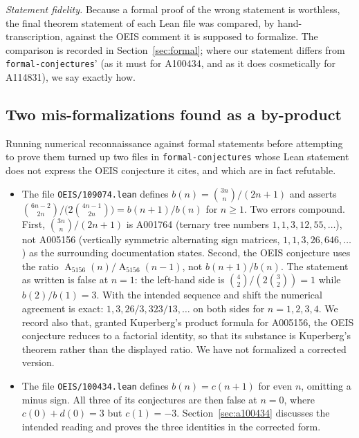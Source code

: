 \documentclass[11pt]{article}
\theoremstyle{plain}
\theoremstyle{definition}
\theoremstyle{remark}
\numberwithin{equation}{section}
\DeclareMathOperator{\Ac}{A}
\begin{document}
\emph{Statement fidelity.} Because a formal proof of the wrong statement is worthless, the final
theorem statement of each Lean file was compared, by hand-transcription, against the OEIS
comment it is supposed to formalize. The comparison is recorded in Section~\ref{sec:formal};
where our statement differs from \texttt{formal-conjectures}' (as it must for A100434, and as it
does cosmetically for A114831), we say exactly how.

\subsection{Two mis-formalizations found as a by-product}
\label{sec:upstream}

Running numerical reconnaissance against formal statements before attempting to prove them
turned up two files in \texttt{formal-conjectures} whose Lean statement does not express the
OEIS conjecture it cites, and which are in fact refutable.

\begin{itemize}
\item The file \texttt{OEIS/109074.lean} defines
$b(n) = \binom{3n}{n}/(2n+1)$ and asserts
$\binom{6n-2}{2n} / \bigl(2\binom{4n-1}{2n}\bigr) = b(n+1)/b(n)$ for $n \ge 1$. Two errors
compound. First, $\binom{3n}{n}/(2n+1)$ is A001764 (ternary tree numbers
$1,1,3,12,55,\dots$), not A005156 (vertically symmetric alternating sign matrices,
$1,1,3,26,646,\dots$) as the surrounding documentation states. Second, the OEIS conjecture uses
the ratio $\Ac_{5156}(n)/\Ac_{5156}(n-1)$, not $b(n+1)/b(n)$. The statement as written is false
at $n=1$: the left-hand side is $\binom42/(2\binom32) = 1$ while $b(2)/b(1) = 3$. With the
intended sequence and shift the numerical agreement is exact:
$1, 3, 26/3, 323/13, \dots$ on both sides for $n = 1,2,3,4$. We record also that, granted
Kuperberg's product formula for A005156, the OEIS conjecture reduces to a factorial identity, so
that its substance is Kuperberg's theorem rather than the displayed ratio. We have not
formalized a corrected version.

\item The file \texttt{OEIS/100434.lean} defines $b(n) = c(n+1)$ for even $n$, omitting
a minus sign. All three of its conjectures are then false at $n=0$, where $c(0)+d(0) = 3$ but
$c(1) = -3$. Section~\ref{sec:a100434} discusses the intended reading and proves the three
identities in the corrected form.
\end{itemize}
\end{document}
